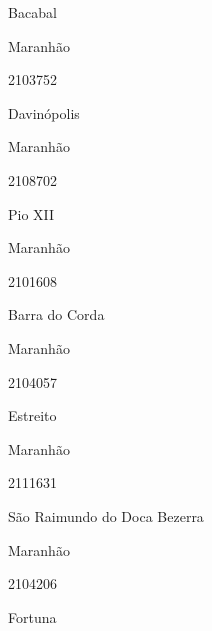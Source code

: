 \documentclass[
  letterpaper,
]{report}
\begin{document}
\n      

Bacabal

\n    

\n    

\n      

Maranhão

\n      

2103752

\n      

Davinópolis

\n    

\n    

\n      

Maranhão

\n      

2108702

\n      

Pio XII

\n    

\n    

\n      

Maranhão

\n      

2101608

\n      

Barra do Corda

\n    

\n    

\n      

Maranhão

\n      

2104057

\n      

Estreito

\n    

\n    

\n      

Maranhão

\n      

2111631

\n      

São Raimundo do Doca Bezerra

\n    

\n    

\n      

Maranhão

\n      

2104206

\n      

Fortuna

\n    

\n    

\n      
\end{document}
